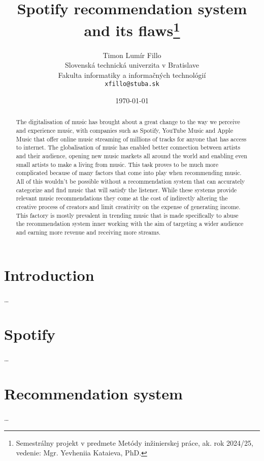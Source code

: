 \documentclass[10pt,twoside,slovak,a4paper]{article}
\title{Spotify recommendation system and its flaws\thanks{Semestrálny projekt v predmete Metódy inžinierskej práce, ak. rok 2024/25, vedenie: Mgr. Yevheniia Kataieva, PhD.}} %
\author{Timon Lumír Fillo\\[2pt]
	{\small Slovenská technická univerzita v Bratislave}\\
	{\small Fakulta informatiky a informačných technológií}\\
	{\small \texttt{xfillo@stuba.sk}}
	}
\date{\small \today} %
\begin{document}
\maketitle

\begin{abstract}

The digitalisation of music has brought about a great change to the way we perceive and experience music, with companies such as Spotify, YouTube Music and Apple Music that offer online music streaming of millions of tracks for anyone that has access to internet. The globalisation of music has enabled better connection between artists and their audience, opening new music markets all around the world and enabling even small artists to make a living from music. This task proves to be much more complicated because of many factors that come into play when recommending music. All of this wouldn't be possible without a recommendation system that can accurately categorize and find music that will satisfy the listener. While these systems provide relevant music recommendations they come at the cost of indirectly altering the creative process of creators and limit creativity on the expense of generating income. This factory is mostly prevalent in trending music that is made specifically to abuse the recommendation system inner working with the aim of targeting a wider audience and earning more revenue and receiving more streams.

\end{abstract}



\section{Introduction}
\dots


\section{Spotify} \label{spotify}
\dots

\section{Recommendation system} \label{recommendationsystem}
\dots
\end{document}
